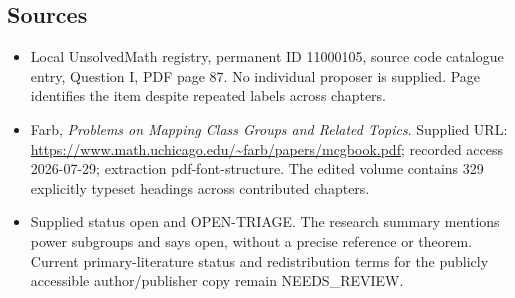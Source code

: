\documentclass[11pt]{article}
\begin{document}
\subsection{Sources}
\begin{itemize}
\item Local UnsolvedMath registry, permanent ID 11000105, source code catalogue entry, Question I, PDF page 87. No individual proposer is supplied. Page identifies the item despite repeated labels across chapters.
\item Farb, \emph{Problems on Mapping Class Groups and Related Topics}. Supplied URL: \url{https://www.math.uchicago.edu/~farb/papers/mcgbook.pdf}; recorded access 2026-07-29; extraction pdf-font-structure. The edited volume contains 329 explicitly typeset headings across contributed chapters.
\item Supplied status open and OPEN-TRIAGE. The research summary mentions power subgroups and says open, without a precise reference or theorem. Current primary-literature status and redistribution terms for the publicly accessible author/publisher copy remain NEEDS\_REVIEW.
\end{itemize}
\end{document}
